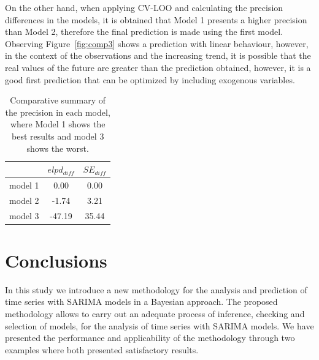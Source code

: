 On the other hand, when applying CV-LOO and calculating the precision differences in the models, it is obtained that Model 1 presents a higher precision than Model 2, therefore the final prediction is made using the first model. Observing Figure~\ref{fig:comp3} shows a prediction with linear behaviour, however, in the context of the observations and the increasing trend, it is possible that the real values of the future are greater than the prediction obtained, however, it is a good first prediction that can be optimized by including exogenous variables.
%
\begin{table}[ht]\centering
	\begin{tabular}{ccc}
		\hline
		& $elpd_{diff}$ & $SE_{diff}$  \\ 
		\hline
		model 1 & 0.00 & 0.00  \\ 
		model 2 & -1.74 & 3.21  \\ 
		model 3 & -47.19 & 35.44 \\ 
		\hline
	\end{tabular}\smallskip 
	\caption{Comparative summary of the precision in each model, where Model 1 shows the best results and model 3 shows the worst.} \label{tab:loo2}
\end{table}
%
\section{Conclusions}
In this study we introduce a new methodology for the analysis and prediction of time series with SARIMA models in a Bayesian approach. The proposed methodology allows to carry out an adequate process of inference, checking and selection of models, for the analysis of time series with SARIMA models.
We have presented the performance and applicability of the methodology through two examples where both presented satisfactory results.

